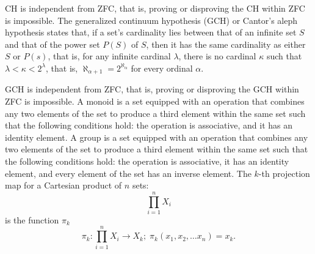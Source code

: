 \documentclass[a4paper,12pt]{article}
\begin{document}
CH is independent from ZFC, that is, proving or disproving the CH within ZFC is impossible.
The generalized continuum hypothesis (GCH) or Cantor's aleph hypothesis states that, if a set's cardinality lies between that of an infinite set $S$ and that of the power set $P(S)$ of $S$, then it has the same cardinality as either $S$ or $P(s)$, that is, for any infinite cardinal $\lambda$, there is no cardinal $\kappa$ such that $\lambda <\kappa <2^{\lambda }$, that is, $\aleph _{\alpha +1}=2^{\aleph _{\alpha }}$ for every ordinal $\alpha$.

GCH is independent from ZFC, that is, proving or disproving the GCH within ZFC is impossible.
A monoid is a set equipped with an operation that combines any two elements of the set to produce a third element within the same set such that the following conditions hold: the operation is associative, and it has an identity element.
A group is a set equipped with an operation that combines any two elements of the set to produce a third element within the same set such that the following conditions hold: the operation is associative, it has an identity element, and every element of the set has an inverse element.
The $k$-th projection map for a Cartesian product of $n$ sets:
\[\prod_{i=1}^nX_i\]
is the function $\pi_k$
\[\pi_k\colon\prod_{i=1}^nX_i\to X_k;\;\pi_k(x_1,x_2,\ldots x_n)=x_k.\]
\end{document}
